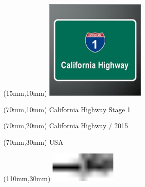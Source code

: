 \null\newpage
\begin{textblock*}{50mm}(15mm,10mm)%
\includegraphics[width=50mm]{LG/2015-05-20_00077.png}
\end{textblock*}
\begin{textblock*}{130mm}(70mm,10mm)%
{\fontsize{20}{20}\selectfont California Highway Stage 1}\\
\end{textblock*}
\begin{textblock*}{120mm}(70mm,20mm)%
{\fontsize{16}{16}\selectfont California Highway / 2015}\\
\end{textblock*}
\begin{textblock*}{120mm}(70mm,30mm)%
{\fontsize{12}{12}\selectfont USA}
\end{textblock*}
\begin{textblock*}{30mm}(110mm,30mm)%
\centering
\includegraphics[height=15mm]{icons/tofinish.pdf}
\end{textblock*}
